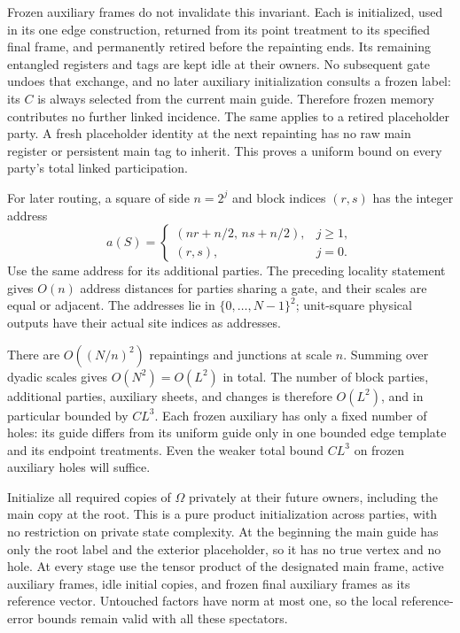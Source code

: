\documentclass[11pt]{article}
\numberwithin{equation}{section}
\theoremstyle{definition}
\theoremstyle{remark}
\begin{document}
Frozen auxiliary frames do not invalidate this invariant.  Each is
initialized, used in its one edge construction, returned from its
point treatment to its specified final frame, and permanently
retired before the repainting ends.  Its remaining entangled
registers and tags are kept idle at their owners.  No subsequent
gate undoes that exchange, and no later auxiliary initialization
consults a frozen label: its $C$ is always selected from the current
main guide.  Therefore frozen memory contributes no further linked
incidence.  The same applies to a retired placeholder party.  A
fresh placeholder identity at the next repainting has no raw main
register or persistent main tag to inherit.  This proves a uniform
bound on every party's total linked participation.

For later routing, a square of side $n=2^j$ and block indices $(r,s)$
has the integer address
\begin{equation}
 a(S)=
 \begin{cases}
 (nr+n/2,\,ns+n/2),&j\ge1,\\
 (r,s),&j=0.
 \end{cases}
 \label{eq:geometry-addresses}
\end{equation}
Use the same address for its additional parties.  The preceding
locality statement gives $O(n)$ address distances for parties sharing
a gate, and their scales are equal or adjacent.  The addresses lie
in $\{0,\ldots,N-1\}^2$; unit-square physical outputs have their
actual site indices as addresses.

There are $O((N/n)^2)$ repaintings and junctions at scale $n$.
Summing over dyadic scales gives $O(N^2)=O(L^2)$ in total.  The number
of block parties, additional parties, auxiliary sheets, and changes
is therefore $O(L^2)$, and in particular bounded by $C L^3$.
Each frozen auxiliary has only a fixed number of holes: its guide
differs from its uniform guide only in one bounded edge template and
its endpoint treatments.  Even the weaker total bound $C L^3$ on
frozen auxiliary holes will suffice.

Initialize all required copies of $\Omega$ privately at their future
owners, including the main copy at the root.  This is a pure product
initialization across parties, with no restriction on private state
complexity.  At the beginning the main guide has only the root label
and the exterior placeholder, so it has no true vertex and no hole.
At every stage use the tensor product of the designated main frame,
active auxiliary frames, idle initial copies, and frozen final
auxiliary frames as its reference vector.  Untouched factors have
norm at most one, so the local reference-error bounds remain valid
with all these spectators.
\end{document}
